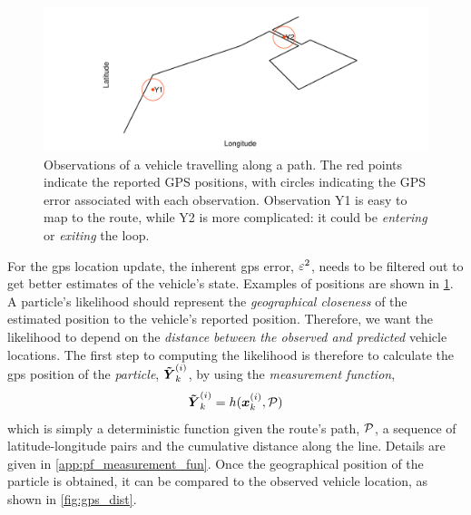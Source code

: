\begin{knitrout}\small
{}\color{fgcolor}\begin{figure}
\includegraphics[width=\maxwidth]{figure/lhood_obs-1} \caption[Observations of a vehicle travelling along a path]{Observations of a vehicle travelling along a path. The red points indicate the reported GPS positions, with circles indicating the GPS error associated with each observation. Observation Y1 is easy to map to the route, while Y2 is more complicated: it could be \emph{entering} or \emph{exiting} the loop.}\label{fig:lhood_obs}
\end{figure}


\end{knitrout}





For the \gls{gps} location update, the inherent \gls{gps} error, $\varepsilon^2$, needs to be filtered out to get better estimates of the vehicle's state. Examples of positions are shown in \cref{fig:lhood_obs}. A particle's likelihood should represent the \emph{geographical closeness} of the estimated position to the vehicle's reported position. Therefore, we want the likelihood to depend on the \emph{distance between the observed and predicted} vehicle locations. The first step to computing the likelihood is therefore to calculate the \gls{gps} position of the \emph{particle}, $\boldsymbol{\tilde Y}^{(i)}_k$, by using the \emph{measurement function},
\begin{equation}
\label{eq:pf_measurement_fun}
\boldsymbol{\tilde Y}^{(i)}_k = h(\boldsymbol x^{(i)}_k, \mathcal{P})
\end{equation}
which is simply a deterministic function given the route's path, $\mathcal{P}$, a sequence of latitude-longitude pairs and the cumulative distance along the line. Details are given in \cref{app:pf_measurement_fun}. Once the geographical position of the particle is obtained, it can be compared to the observed vehicle location, as shown in \cref{fig:gps_dist}.


